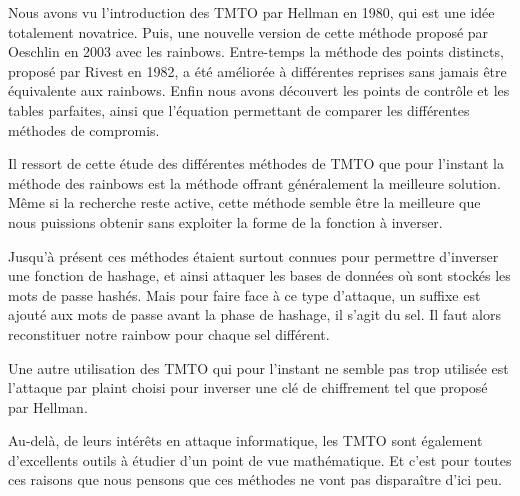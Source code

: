 
	Nous avons vu l'introduction des \gls{TMTO} par Hellman en 1980, qui est une idée totalement novatrice. Puis, une nouvelle version de cette méthode proposé par Oeschlin en 2003 avec les \glspl{rainbow}. Entre-temps la méthode des points distincts, proposé par Rivest en 1982, a été améliorée à différentes reprises sans jamais être équivalente aux \glspl{rainbow}. Enfin nous avons découvert les points de contrôle et les tables parfaites, ainsi que l'équation permettant de comparer les différentes méthodes de compromis.

	\bigskip

	Il ressort de cette étude des différentes méthodes de \gls{TMTO} que pour l'instant la méthode des \glspl{rainbow} est la méthode offrant généralement la meilleure solution. Même si la recherche reste active, cette méthode semble être la meilleure que nous puissions obtenir sans exploiter la forme de la fonction à inverser.

	\bigskip

	Jusqu'à présent ces méthodes étaient surtout connues pour permettre d'inverser une fonction de hashage, et ainsi attaquer les bases de données où sont stockés les mots de passe hashés. Mais pour faire face à ce type d'attaque, un suffixe est ajouté aux mots de passe avant la phase de hashage, il s'agit du sel. Il faut alors reconstituer notre \gls{rainbow} pour chaque sel différent. \textbf{\textit{}}

	\bigskip

	Une autre utilisation des \gls{TMTO} qui pour l'instant ne semble pas trop utilisée est l'attaque par \gls{plaint} choisi pour inverser une clé de chiffrement tel que proposé par Hellman.

	\bigskip

	Au-delà, de leurs intérêts en attaque informatique, les \gls{TMTO} sont également d'excellents outils à étudier d'un point de vue mathématique. Et c'est pour toutes ces raisons que nous pensons que ces méthodes ne vont pas disparaître d'ici peu. 

\endinput{}
